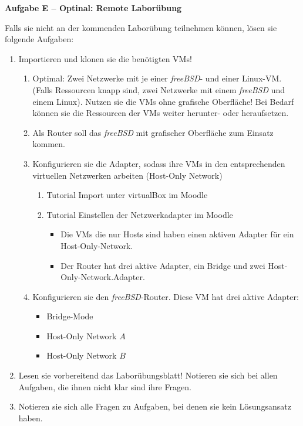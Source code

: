 \documentclass[paper=a4,fontsize=11pt]{scrartcl}%
\numberwithin{equation}{section}
\begin{document}
\begin{center}
\Large{\textbf{Aufgabe E -- Optinal: Remote Laborübung}}
\end{center}
\vskip0.25in
Falls sie nicht an der kommenden Laborübung teilnehmen können, lösen sie folgende Aufgaben:
\begin{enumerate}
	\item Importieren und klonen sie die benötigten VMs!
	\begin{enumerate}
		\item Optimal: Zwei Netzwerke mit je einer \emph{freeBSD}- und einer Linux-VM. (Falls Ressourcen knapp sind, zwei Netzwerke mit einem \emph{freeBSD} und einem Linux). Nutzen sie die VMs ohne grafische Oberfläche! Bei Bedarf können sie die Ressourcen der VMs weiter herunter- oder heraufsetzen.
		\item Als Router soll das \emph{freeBSD} mit grafischer Oberfläche zum Einsatz kommen.
		\item Konfigurieren sie die Adapter, sodass ihre VMs in den entsprechenden virtuellen Netzwerken arbeiten (Host-Only Network)
		\begin{enumerate}
			\item Tutorial Import unter virtualBox im Moodle
			\item Tutorial Einstellen der Netzwerkadapter im Moodle
			\begin{itemize}
				\item Die VMs die nur Hosts sind haben einen aktiven Adapter für ein Host-Only-Network.
				\item Der Router hat drei aktive Adapter, ein Bridge und zwei Host-Only-Network.Adapter.
			\end{itemize}
		\end{enumerate}
		\item Konfigurieren sie den \emph{freeBSD}-Router. Diese VM hat drei aktive Adapter: 
		\begin{itemize}
			\item Bridge-Mode
			\item Host-Only Network $A$
			\item Host-Only Network $B$
		\end{itemize}
	\end{enumerate}
	\item Lesen sie vorbereitend das Laborübungsblatt! Notieren sie sich bei allen Aufgaben, die ihnen nicht klar sind ihre Fragen. 
	\item Notieren sie sich alle Fragen zu Aufgaben, bei denen sie kein Lösungsansatz haben.
\end{enumerate}



\end{document}
